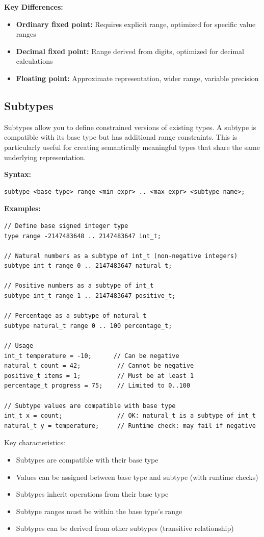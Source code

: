 \documentclass[11pt,letterpaper,twoside,openany]{book}
\begin{document}
\textbf{Key Differences:}
\begin{itemize}
\item \textbf{Ordinary fixed point:} Requires explicit range, optimized for specific value ranges
\item \textbf{Decimal fixed point:} Range derived from digits, optimized for decimal calculations
\item \textbf{Floating point:} Approximate representation, wider range, variable precision
\end{itemize}

\subsection{Subtypes}

Subtypes allow you to define constrained versions of existing types. A subtype is compatible with its base type but has additional range constraints. This is particularly useful for creating semantically meaningful types that share the same underlying representation.

\textbf{Syntax:}
\begin{lstlisting}
subtype <base-type> range <min-expr> .. <max-expr> <subtype-name>;
\end{lstlisting}

\textbf{Examples:}
\begin{lstlisting}
// Define base signed integer type
type range -2147483648 .. 2147483647 int_t;

// Natural numbers as a subtype of int_t (non-negative integers)
subtype int_t range 0 .. 2147483647 natural_t;

// Positive numbers as a subtype of int_t
subtype int_t range 1 .. 2147483647 positive_t;

// Percentage as a subtype of natural_t
subtype natural_t range 0 .. 100 percentage_t;

// Usage
int_t temperature = -10;      // Can be negative
natural_t count = 42;          // Cannot be negative
positive_t items = 1;          // Must be at least 1
percentage_t progress = 75;    // Limited to 0..100

// Subtype values are compatible with base type
int_t x = count;               // OK: natural_t is a subtype of int_t
natural_t y = temperature;     // Runtime check: may fail if negative
\end{lstlisting}

Key characteristics:
\begin{itemize}
\item Subtypes are compatible with their base type
\item Values can be assigned between base type and subtype (with runtime checks)
\item Subtypes inherit operations from their base type
\item Subtype ranges must be within the base type's range
\item Subtypes can be derived from other subtypes (transitive relationship)
\end{itemize}
\end{document}
